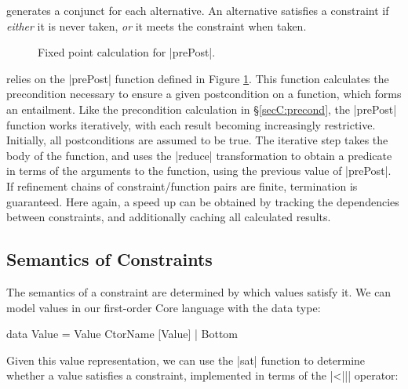  generates a conjunct for each alternative. An alternative satisfies a constraint if \textit{either} it is never taken, \textit{or} it meets the constraint when taken.

\begin{figure}
\ignore{}
\caption{Fixed point calculation for |prePost|.}
\label{figC:property_fixp}
\end{figure}

 relies on the |prePost| function defined in Figure \ref{figC:property_fixp}. This function calculates the precondition necessary to ensure a given postcondition on a function, which forms an entailment. Like the precondition calculation in \S\ref{secC:precond}, the |prePost| function works iteratively, with each result becoming increasingly restrictive. Initially, all postconditions are assumed to be true. The iterative step takes the body of the function, and uses the |reduce| transformation to obtain a predicate in terms of the arguments to the function, using the previous value of |prePost|. If refinement chains of constraint/function pairs are finite, termination is guaranteed. Here again, a speed up can be obtained by tracking the dependencies between constraints, and additionally caching all calculated results.

\subsection{Semantics of Constraints}
\label{secC:constraint_semantics}

The semantics of a constraint are determined by which values satisfy it. We can model values in our first-order Core language with the data type:

\begin{code}
data Value  =  Value CtorName [Value]
            |  Bottom
\end{code}

Given this value representation, we can use the |sat| function to determine whether a value satisfies a constraint, implemented in terms of the |<||| operator:

